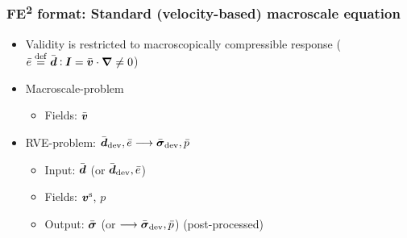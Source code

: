 \documentclass[11pt]{beamer} %
\begin{document}
\begin{frame}
 \frametitle{FE\textsuperscript{2} format: Standard (velocity-based) macroscale equation}
 \begin{itemize}
  \item Validity is restricted to macroscopically compressible response ($\bar{e} \overset{\mathrm{def}}{=} \bar{\boldsymbol{d}} \mathbin{\vcentcolon} \boldsymbol{I} = \bar{\boldsymbol{v}}\cdot \boldsymbol{\nabla}\neq 0$)
 \end{itemize}
 \begin{itemize}
  \item Macroscale-problem
  \begin{itemize}
   \item Fields: $\bar{\boldsymbol{v}}$%
  \end{itemize}
  \item RVE-problem: $\bar{\boldsymbol{d}}_{\mathrm{dev}}, \bar{e} \longrightarrow \bar{\boldsymbol{\sigma}}_{\mathrm{dev}}, \bar{p}$
  \begin{itemize}
   \item Input: $\bar{\boldsymbol{d}}$ (or $\bar{\boldsymbol{d}}_{\mathrm{dev}}, \bar{e}$)
   \item Fields: $\boldsymbol{v}^{\mathrm{s}}$, $p$%
   \item Output: $\bar{\boldsymbol{\sigma}}$ (or $\longrightarrow \bar{\boldsymbol{\sigma}}_{\mathrm{dev}}, \bar{p}$) (post-processed)
  \end{itemize}
 \end{itemize}


\end{frame}
\end{document}
